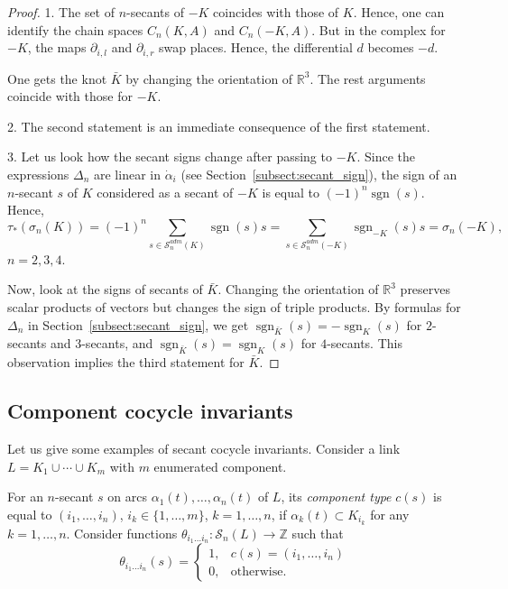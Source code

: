 \documentclass{article}
\theoremstyle{definition}
\theoremstyle{remark}
\def\Z{{\mathbb Z}}
\def\R{{\mathbb R}}
\DeclareMathOperator{\sgn}{\mathrm{sgn}}
\begin{document}
\begin{proof}
    1. The set of $n$-secants of $-K$ coincides with those of $K$. Hence, one can identify the chain spaces $C_n(K,A)$ and $C_n(-K,A)$. But in the complex for $-K$, the maps $\partial_{i,l}$ and $\partial_{i,r}$ swap places. Hence, the differential $d$ becomes $-d$.

    One gets the knot $\bar K$ by changing the orientation of $\R^3$. The rest arguments coincide with those for $-K$.

    2. The second statement is an immediate consequence of the first statement.

    3. Let us look how the secant signs change after passing to $-K$. Since the expressions $\Delta_n$ are linear in $\dot\alpha_i$ (see Section~\ref{subsect:secant_sign}), the sign of an $n$-secant $s$ of $K$ considered as a secant of $-K$ is equal to $(-1)^n\sgn(s)$. Hence,
\[
\tau_*(\sigma_n(K))=(-1)^n\sum_{s\in \mathcal S^{adm}_n(K)}\sgn(s)s=
\sum_{s\in \mathcal S^{adm}_n(-K)}\sgn_{-K}(s)s=\sigma_n(-K),
\]
$n=2,3,4$.

Now, look at the signs of secants of $\bar K$. Changing the orientation of $\R^3$ preserves scalar products of vectors but changes the sign of triple products. By formulas for $\Delta_n$ in Section~\ref{subsect:secant_sign}, we get $\sgn_{\bar K}(s)=-\sgn_K(s)$ for $2$-secants and $3$-secants, and $\sgn_{\bar K}(s)=\sgn_K(s)$ for $4$-secants. This observation implies the third statement for $\bar K$.
\end{proof}

\subsection{Component cocycle invariants}\label{subsect:component_cocycles}

Let us give some examples of secant cocycle invariants. Consider a link $L=K_1\cup\cdots\cup K_m$ with $m$ enumerated component.

For an $n$-secant $s$ on arcs $\alpha_1(t),\dots,\alpha_n(t)$ of $L$, its \emph{component type} $c(s)$ is equal to $(i_1,\dots,i_n)$, $i_k\in\{1,\dots,m\}$, $k=1,\dots,n$, if $\alpha_k(t)\subset K_{i_k}$ for any $k=1,\dots,n$. Consider functions $\theta_{i_1\dots i_n}\colon\mathcal S_n(L)\to\Z$ such that
\[
\theta_{i_1\dots i_n}(s)=\left\{\begin{array}{cl}
    1, &  c(s)=(i_1,\dots,i_n)\\
    0, & \mbox{otherwise}.
\end{array}\right.
\]
\end{document}
